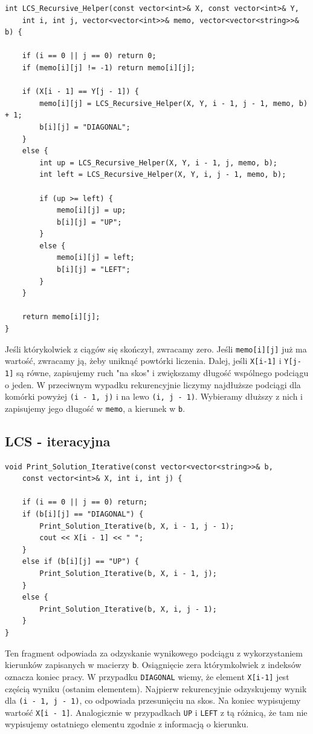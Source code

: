 \documentclass{article}
\begin{document}
\begin{verbatim}
int LCS_Recursive_Helper(const vector<int>& X, const vector<int>& Y, 
    int i, int j, vector<vector<int>>& memo, vector<vector<string>>& b) {
    
    if (i == 0 || j == 0) return 0;
    if (memo[i][j] != -1) return memo[i][j];

    if (X[i - 1] == Y[j - 1]) {
        memo[i][j] = LCS_Recursive_Helper(X, Y, i - 1, j - 1, memo, b) + 1;
        b[i][j] = "DIAGONAL";
    }
    else {
        int up = LCS_Recursive_Helper(X, Y, i - 1, j, memo, b);
        int left = LCS_Recursive_Helper(X, Y, i, j - 1, memo, b);

        if (up >= left) {
            memo[i][j] = up;
            b[i][j] = "UP";
        }
        else {
            memo[i][j] = left;
            b[i][j] = "LEFT";
        }
    }

    return memo[i][j];
}
\end{verbatim}

Jeśli którykolwiek z ciągów się skończył, zwracamy zero. Jeśli \texttt{memo[i][j]} już ma wartość, zwracamy ją, żeby uniknąć powtórki liczenia. Dalej, jeśli \texttt{X[i-1]} i \texttt{Y[j-1]} są równe, zapisujemy ruch "na skos" i zwiększamy długość wspólnego podciągu o jeden. W przeciwnym wypadku rekurencyjnie liczymy najdłuższe podciągi dla komórki powyżej \texttt{(i - 1, j)} i na lewo \texttt{(i, j - 1)}. Wybieramy dłuższy z nich i zapisujemy jego długość w \texttt{memo}, a kierunek w \texttt{b}.

\subsection{LCS - iteracyjna}

\begin{verbatim}
void Print_Solution_Iterative(const vector<vector<string>>& b, 
    const vector<int>& X, int i, int j) {
    
    if (i == 0 || j == 0) return;
    if (b[i][j] == "DIAGONAL") {
        Print_Solution_Iterative(b, X, i - 1, j - 1);
        cout << X[i - 1] << " ";
    }
    else if (b[i][j] == "UP") {
        Print_Solution_Iterative(b, X, i - 1, j);
    }
    else {
        Print_Solution_Iterative(b, X, i, j - 1);
    }
}
\end{verbatim}

Ten fragment odpowiada za odzyskanie wynikowego podciągu z wykorzystaniem kierunków zapisanych w macierzy \texttt{b}. Osiągnięcie zera którymkolwiek z indeksów oznacza koniec pracy. W przypadku \texttt{DIAGONAL} wiemy, że element \texttt{X[i-1]} jest częścią wyniku (ostanim elementem). Najpierw rekurencyjnie odzyskujemy wynik dla \texttt{(i - 1, j - 1)}, co odpowiada przesunięciu na skos. Na koniec wypisujemy wartość \texttt{X[i - 1]}. Analogicznie w przypadkach \texttt{UP} i \texttt{LEFT} z tą różnicą, że tam nie wypisujemy ostatniego elementu zgodnie z informacją o kierunku.
\end{document}
